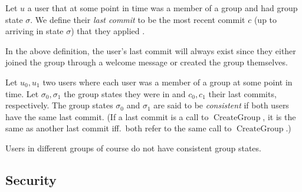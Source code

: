 \begin{definition}
	Let $u$ a user that at some point in time was a member of a group and had group state $\sigma$. We define their \emph{last commit} to be the most recent commit $c$ (up to arriving in state $\sigma$) that they applied .
\end{definition}

In the above definition, the user's last commit will always exist since they either joined the group through a welcome message or created the group themselves.

\begin{definition} \label{def:consistent-group-state}
	Let $u_0, u_1$ two users where each user was a member of a group at some point in time. Let $\sigma_0, \sigma_1$ the group states they were in and $c_0, c_1$ their last commits, respectively. The group states $\sigma_0$ and $\sigma_1$ are said to be \emph{consistent} if both users have the same last commit. (If a last commit is a call to $\operatorname{CreateGroup}$, it is the same as another last commit iff.\ both refer to the same call to $\operatorname{CreateGroup}$.)
\end{definition}

Users in different groups of course do not have consistent group states.


\subsection{Security}


